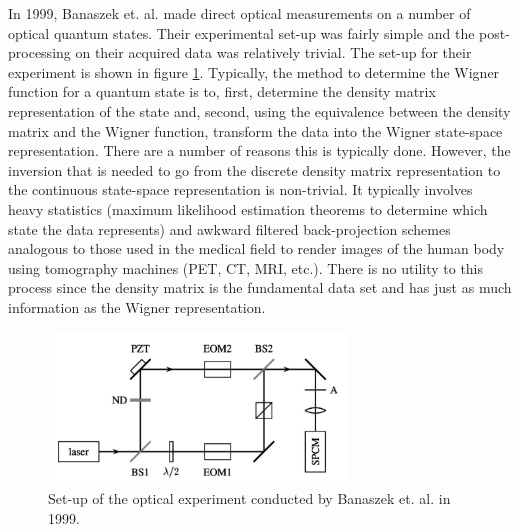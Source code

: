 In 1999, Banaszek et. al. made direct optical measurements on a number of optical quantum states. Their experimental set-up was fairly simple and the post-processing on their acquired data was relatively trivial. The set-up for their experiment is shown in figure \ref{BanaSetUp}. Typically, the method to determine the Wigner function for a quantum state is to, first, determine the density matrix representation of the state and, second, using the equivalence between the density matrix and the Wigner function, transform the data into the Wigner state-space representation. There are a number of reasons this is typically done. However, the inversion that is needed to go from the discrete density matrix representation to the continuous state-space representation is non-trivial. It typically involves heavy statistics (maximum likelihood estimation theorems to determine which state the data represents) and awkward filtered back-projection schemes analogous to those used in the medical field to render images of the human body using tomography machines (PET, CT, MRI, etc.). There is no utility to this process since the density matrix is the fundamental data set and has just as much information as the Wigner representation.

\begin{figure}%
\includegraphics[width=300px,height=153px]{Figures/BanaSetUp.png}%
\caption{Set-up of the optical experiment conducted by Banaszek et. al. in 1999.}%
\label{BanaSetUp}%
\end{figure}

